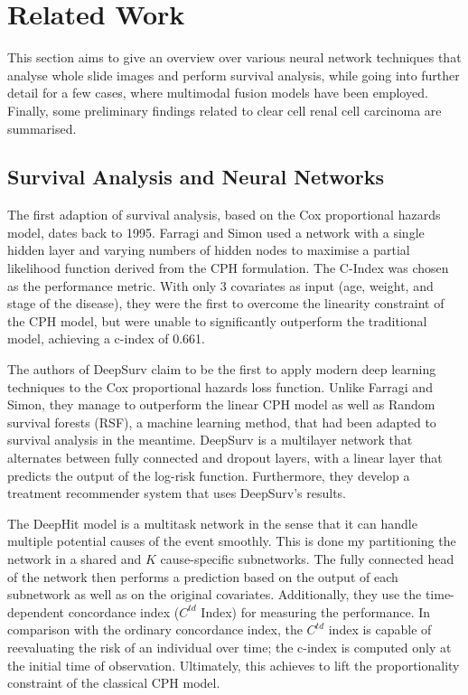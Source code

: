 \chapter{Related Work}\label{related}

This section aims to give an overview over various neural network techniques that analyse whole slide images and perform survival analysis, while going into further detail for a few cases, where multimodal fusion models have been employed. Finally, some preliminary findings related to clear cell renal cell carcinoma are summarised. 

\section{Survival Analysis and Neural Networks}
The first adaption of survival analysis, based on the Cox proportional hazards model, dates back to 1995. Farragi and Simon used a network with a single hidden layer and varying numbers of hidden nodes to maximise a partial likelihood function derived from the CPH formulation. The C-Index was chosen as the performance metric. With only 3 covariates as input (age, weight, and stage of the disease), they were the first to overcome the linearity constraint of the CPH model, but were unable to significantly outperform the traditional model, achieving a c-index of 0.661. \cite{Faraggi1995neural}

The authors of DeepSurv claim to be the first to apply modern deep learning techniques to the Cox proportional hazards loss function. Unlike Farragi and Simon, they manage to outperform the linear CPH model as well as Random survival forests (RSF), a machine learning method, that had been adapted to survival analysis in the meantime. DeepSurv is a multilayer network that alternates between fully connected and dropout layers, with a linear layer that predicts the output of the log-risk function. Furthermore, they develop a treatment recommender system that uses DeepSurv's results. \cite{Katzman2018DeepSurv}

The DeepHit model is a multitask network in the sense that it can handle multiple potential causes of the event smoothly. This is done my partitioning the network in a shared and $K$ cause-specific subnetworks. 
The fully connected head of the network then performs a prediction based on the output of each subnetwork as well as on the original covariates. Additionally, they use the time-dependent concordance index ($C^{td}$ Index) for measuring the performance. In comparison with the ordinary concordance index, the $C^{td}$ index is capable of reevaluating the risk of an individual over time; the c-index is computed only at the initial time of observation. Ultimately, this achieves to lift the proportionality constraint of the classical CPH model. \cite{Lee2018DeepHit}

